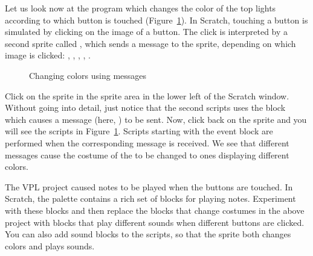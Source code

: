 


Let us look now at the program  which changes the color of
the top lights according to which button is touched
(Figure~\ref{fig.colors}). In Scratch, touching a button is simulated by
clicking on the image of a button. The click is interpreted by a second
sprite called , which sends a message to the  sprite,
depending on which image is clicked: , , ,
, .

\begin{figure}
\caption{Changing colors using messages}\label{fig.colors}
\end{figure}

Click on the  sprite in the sprite area in the lower left of
the Scratch window. Without going into detail, just notice that the
second scripts uses the block  which causes
a message (here, ) to be sent. Now, click back on the 
sprite and you will see the scripts in Figure~\ref{fig.colors}. Scripts
starting with the event block  are performed when
the corresponding message is received. We see that different messages
cause the costume of the  to be changed to ones displaying
different colors.



The VPL project  caused notes to be played when the buttons
are touched. In Scratch, the  palette contains a rich set of
blocks for playing notes. Experiment with these blocks and then replace
the blocks that change costumes in the above project with blocks that
play different sounds when different buttons are clicked. You can also
add sound blocks to the scripts, so that the sprite both changes colors
and plays sounds.
